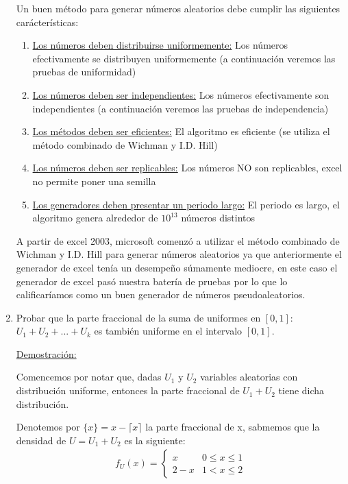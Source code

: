 \documentclass[12 pt]{article}\usepackage[]{graphicx}\usepackage[]{color}
\begin{document}
\begin{enumerate}
    Un buen método para generar números aleatorios debe cumplir las siguientes carácterísticas:
    \begin{enumerate}
        \item \underline{Los números deben distribuirse uniformemente:} Los números efectivamente se distribuyen uniformemente (a continuación veremos las pruebas de uniformidad)
        \item \underline{Los números deben ser independientes:} Los números efectivamente son independientes (a continuación veremos las pruebas de independencia)
        \item \underline{Los métodos deben ser eficientes:} El algoritmo es eficiente (se utiliza el método combinado de Wichman y I.D. Hill)
        \item \underline{Los números deben ser replicables:} Los números NO son replicables, excel no permite poner una semilla
        \item \underline{Los generadores deben presentar un periodo largo:} El periodo es largo, el algoritmo genera alrededor de $10^13$ números distintos
    \end{enumerate}

    A partir de excel 2003, microsoft comenzó a utilizar el método combinado de Wichman y I.D. Hill para generar números aleatorios ya que anteriormente el generador de excel tenía un desempeño súmamente mediocre, en este caso el generador de excel pasó nuestra batería de pruebas por lo que lo calificaríamos como un buen generador de números pseudoaleatorios.
    

    \newpage
    \item Probar que la parte fraccional de la suma de uniformes en $[0,1]$: $U_1 + U_2 + ... + U_k$ es también uniforme en el intervalo $[0,1]$.
    
    \underline{Demostración:} 
    
    Comencemos por notar que, dadas $U_1$ y $U_2$ variables aleatorias con distribución uniforme, entonces la parte fraccional de $U_1 + U_2$ tiene dicha distribución.
    
    Denotemos por $\{x\} = x -  \lceil x \rceil $ la parte fraccional de x, sabmemos que la densidad de $U = U_1 + U_2$ es la siguiente: 
    \begin{align*}
        f_U(x) = \begin{cases} 
              x & 0 \leq x \leq 1\\
              2-x & 1 < x \leq 2
           \end{cases}
    \end{align*}
    

\end{enumerate}
\end{document}
